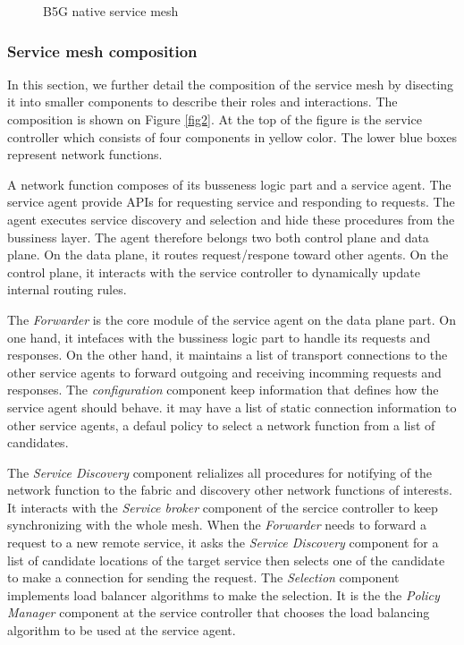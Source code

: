 \documentclass[a4paper]{article}
\begin{document}
\begin{figure}[h!]
\begin{center}
  \caption{B5G native service mesh  \label{fig1}}
  \end{center}
\end{figure}




\subsubsection{Service mesh composition}

In this section, we further detail the composition of the service mesh by disecting it into smaller components to describe their roles and interactions. The composition is shown on Figure \ref{fig2}. At the top of the figure is the service controller which consists of four components in yellow color. The lower blue boxes represent network functions.

A network function composes of its busseness logic part and a service agent. The service agent provide APIs for requesting service and responding to requests. The agent executes service discovery and selection and hide these procedures from the bussiness layer. The agent therefore belongs two both control plane and data plane. On the data plane, it routes request/respone toward other agents. On the control plane, it interacts with the service controller to dynamically update internal routing rules.

The \textit{Forwarder} is the core module of the service agent on the data plane part. On one hand, it intefaces with the bussiness logic part to handle its requests and responses. On the other hand, it maintains a list of transport connections to the other service agents to forward outgoing and receiving incomming requests and responses. The \textit{configuration} component keep information that defines how the service agent should behave. it may have a list of static connection information to other service agents, a defaul policy to select a network function from a list of candidates.

The \textit{Service Discovery} component relializes all procedures for notifying of the network function to the fabric and discovery other network functions of interests. It interacts with the \textit{Service broker} component of the sercice controller to keep synchronizing with the whole mesh. When the \textit{Forwarder} needs to forward a request to a new remote service, it asks the \textit{Service Discovery} component for a list of candidate locations of the target service then selects one of the candidate to make a connection for sending the request. The \textit{Selection} component implements load balancer algorithms to make the selection. It is the the \textit{Policy Manager} component at the service controller that chooses the load balancing algorithm to be used at the service agent.
\end{document}
